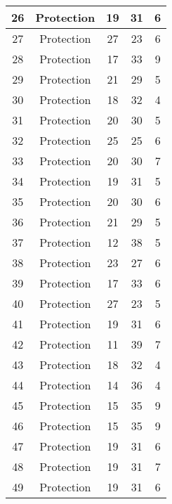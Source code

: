 \documentclass[results.tex]{subfiles}
\begin{document}
\begin{center}
\begin{tabular}{| c || c | c | c | c |}
    \hline
    26 & Protection & 19 & 31 & 6 \\ 
    \hline
    27 & Protection & 27 & 23 & 6 \\ 
    \hline
    28 & Protection & 17 & 33 & 9 \\ 
    \hline
    29 & Protection & 21 & 29 & 5 \\ 
    \hline
    30 & Protection & 18 & 32 & 4 \\ 
    \hline
    31 & Protection & 20 & 30 & 5 \\ 
    \hline
    32 & Protection & 25 & 25 & 6 \\ 
    \hline
    33 & Protection & 20 & 30 & 7 \\ 
    \hline
    34 & Protection & 19 & 31 & 5 \\ 
    \hline
    35 & Protection & 20 & 30 & 6 \\ 
    \hline
    36 & Protection & 21 & 29 & 5 \\ 
    \hline
    37 & Protection & 12 & 38 & 5 \\ 
    \hline
    38 & Protection & 23 & 27 & 6 \\ 
    \hline
    39 & Protection & 17 & 33 & 6 \\ 
    \hline
    40 & Protection & 27 & 23 & 5 \\ 
    \hline
    41 & Protection & 19 & 31 & 6 \\ 
    \hline
    42 & Protection & 11 & 39 & 7 \\ 
    \hline
    43 & Protection & 18 & 32 & 4 \\ 
    \hline
    44 & Protection & 14 & 36 & 4 \\ 
    \hline
    45 & Protection & 15 & 35 & 9 \\ 
    \hline
    46 & Protection & 15 & 35 & 9 \\ 
    \hline
    47 & Protection & 19 & 31 & 6 \\ 
    \hline
    48 & Protection & 19 & 31 & 7 \\ 
    \hline
    49 & Protection & 19 & 31 & 6 \\ 
    \hline   \end{tabular}
\end{center}
\end{document}
